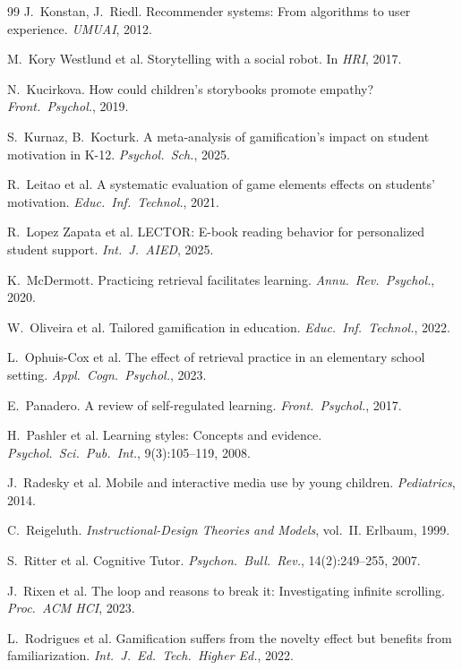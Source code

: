 \documentclass[11pt,a4paper]{article}
\begin{document}
\begin{thebibliography}{99}
 J.~Konstan, J.~Riedl. Recommender systems: From algorithms to user experience. \emph{UMUAI}, 2012.

 M.~Kory Westlund et al. Storytelling with a social robot. In \emph{HRI}, 2017.

 N.~Kucirkova. How could children's storybooks promote empathy? \emph{Front.\ Psychol.}, 2019.

 S.~Kurnaz, B.~Kocturk. A meta-analysis of gamification's impact on student motivation in K-12. \emph{Psychol.\ Sch.}, 2025.

 R.~Leitao et al. A systematic evaluation of game elements effects on students' motivation. \emph{Educ.\ Inf.\ Technol.}, 2021.

 R.~Lopez Zapata et al. LECTOR: E-book reading behavior for personalized student support. \emph{Int.\ J.\ AIED}, 2025.

 K.~McDermott. Practicing retrieval facilitates learning. \emph{Annu.\ Rev.\ Psychol.}, 2020.

 W.~Oliveira et al. Tailored gamification in education. \emph{Educ.\ Inf.\ Technol.}, 2022.

 L.~Ophuis-Cox et al. The effect of retrieval practice in an elementary school setting. \emph{Appl.\ Cogn.\ Psychol.}, 2023.

 E.~Panadero. A review of self-regulated learning. \emph{Front.\ Psychol.}, 2017.

 H.~Pashler et al. Learning styles: Concepts and evidence. \emph{Psychol.\ Sci.\ Pub.\ Int.}, 9(3):105--119, 2008.

 J.~Radesky et al. Mobile and interactive media use by young children. \emph{Pediatrics}, 2014.

 C.~Reigeluth. \emph{Instructional-Design Theories and Models}, vol.\ II. Erlbaum, 1999.

 S.~Ritter et al. Cognitive Tutor. \emph{Psychon.\ Bull.\ Rev.}, 14(2):249--255, 2007.

 J.~Rixen et al. The loop and reasons to break it: Investigating infinite scrolling. \emph{Proc.\ ACM HCI}, 2023.

 L.~Rodrigues et al. Gamification suffers from the novelty effect but benefits from familiarization. \emph{Int.\ J.\ Ed.\ Tech.\ Higher Ed.}, 2022.


\end{thebibliography}
\end{document}
